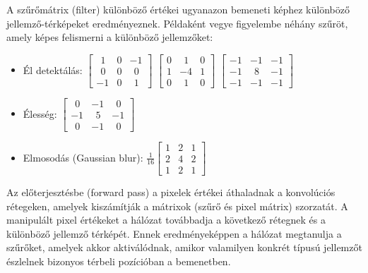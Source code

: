 A szűrőmátrix (filter) különböző értékei ugyanazon bemeneti képhez különböző jellemző-térképeket eredményeznek. Példaként vegye figyelembe néhány szűröt, amely képes felismerni a különböző jellemzőket:
\begin{itemize}
\item Él detektálás: 
$
\begin{bmatrix}
\ \ 1 & 0 & -1 \\
\ \ 0 & 0 & \ \ 0 \\
-1 & 0 & \ \ 1
\end{bmatrix}
$
$
\begin{bmatrix}
0 &  \ \ 1 & 0 \\
1 & -4 & 1 \\
0 &  \ \ 1 & 0
\end{bmatrix}
$
$
\begin{bmatrix}
-1 &  -1 & -1 \\
-1 & \ \ 8 & -1 \\
-1 &  -1 & -1
\end{bmatrix}
$
\item Élesség: $\begin{bmatrix}
\ \ 0 & -1 & \ \ 0 \\
-1 & \ \ 5 & -1 \\
\ \ 0 & -1 & \ \ 0
\end{bmatrix}$
\item Elmosodás (Gaussian blur): $\frac{1}{16}
\begin{bmatrix}
1 & 2 & 1 \\
2 & 4 & 2 \\
1 & 2 & 1
\end{bmatrix}$
\end{itemize}

Az előterjesztésbe (forward pass) a pixelek értékei áthaladnak a konvolúciós rétegeken, amelyek kiszámítják a mátrixok (szűrő és pixel mátrix) szorzatát. A manipulált pixel értékeket a hálózat továbbadja a következő rétegnek és a különböző jellemző térképét. Ennek eredményeképpen a hálózat megtanulja a szűrőket, amelyek akkor aktiválódnak, amikor valamilyen konkrét típusú jellemzőt észlelnek bizonyos térbeli pozícióban a bemenetben.
